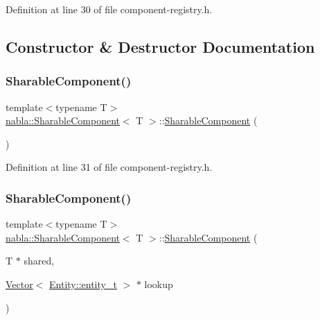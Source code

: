 Definition at line 30 of file component-\/registry.\+h.



\subsection{Constructor \& Destructor Documentation}
\mbox{\label{structnabla_1_1_sharable_component_aa3c361b3a23b20fc318a78eb59b5b827}} 
\subsubsection{\texorpdfstring{SharableComponent()}{SharableComponent()}\hspace{0.1cm}{\footnotesize\ttfamily [1/2]}}
{\footnotesize\ttfamily template$<$typename T$>$ \\
\mbox{\hyperlink{structnabla_1_1_sharable_component}{nabla\+::\+Sharable\+Component}}$<$ T $>$\+::\mbox{\hyperlink{structnabla_1_1_sharable_component}{Sharable\+Component}} (\begin{DoxyParamCaption}{ }\end{DoxyParamCaption})\hspace{0.3cm}{\ttfamily [inline]}}



Definition at line 31 of file component-\/registry.\+h.

\mbox{\label{structnabla_1_1_sharable_component_a66948fd88fd9e72ee9308675527933a9}} 
\subsubsection{\texorpdfstring{SharableComponent()}{SharableComponent()}\hspace{0.1cm}{\footnotesize\ttfamily [2/2]}}
{\footnotesize\ttfamily template$<$typename T$>$ \\
\mbox{\hyperlink{structnabla_1_1_sharable_component}{nabla\+::\+Sharable\+Component}}$<$ T $>$\+::\mbox{\hyperlink{structnabla_1_1_sharable_component}{Sharable\+Component}} (\begin{DoxyParamCaption}\item[{T $\ast$}]{shared,  }\item[{\mbox{\hyperlink{namespacenabla_a34f7ca8c9af290f9af3ed299236ff959}{Vector}}$<$ \mbox{\hyperlink{structnabla_1_1_entity_a0e7d5826cda759dfeb3a81c8175f3b4d}{Entity\+::entity\+\_\+t}} $>$ $\ast$}]{lookup }\end{DoxyParamCaption})\hspace{0.3cm}{\ttfamily [inline]}}




